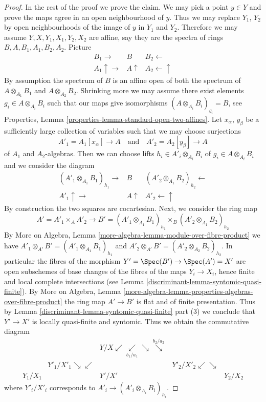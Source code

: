 \begin{proof}
\medskip\noindent
In the rest of the proof we prove the claim. We may pick a point
$y \in Y$ and prove the maps agree in an open neighbourhood of $y$.
Thus we may replace $Y_1$, $Y_2$ by open neighbourhoods of the
image of $y$ in $Y_1$ and $Y_2$. Therefore we may assume
$Y, X, Y_1, X_1, Y_2, X_2$ are affine, say they are the spectra
of rings $B, A, B_1, A_1, B_2, A_2$. Picture
$$
\begin{array}{ccc}B_1 \longrightarrow & B & B_2 \longleftarrow \\ A_1 \uparrow\longrightarrow & A \uparrow & A_2 \longleftarrow\uparrow\end{array}
$$
By assumption the spectrum of $B$ is an affine open of
both the spectrum of $A \otimes_{A_1} B_1$ and $A \otimes_{A_2} B_2$.
Shrinking more we may assume there exist elements
$g_i \in A \otimes_{A_i} B_i$ such that our maps give isomorphisms
$(A \otimes_{A_i} B_i)_{g_i} = B$, see
Properties, Lemma \ref{properties-lemma-standard-open-two-affines}.
Let $x_\alpha$, $y_\beta$ be a sufficiently large collection of
variables such that we may choose surjections
$$
A'_1 = A_1[x_\alpha] \to A
\quad\text{and}\quad
A'_2 = A_2[y_\beta] \to A
$$
of $A_1$ and $A_2$-algebras. Then we can choose lifts
$h_i \in A'_i \otimes_{A_i} B_i$ of $g_i \in A \otimes_{A_i} B_i$
and we consider the diagram
$$
\begin{array}{ccc}(A'_1 \otimes_{A_1} B_1)_{h_1} \longrightarrow & B & (A'_2 \otimes_{A_1} B_2)_{h_2} \longleftarrow \\ A'_1 \uparrow\longrightarrow & A \uparrow & A'_2 \longleftarrow\uparrow\end{array}
$$
By construction the two squares are cocartesian. Next, we consider the
ring map
$$
A' = A'_1 \times_A A'_2 \longrightarrow
B' =
(A'_1 \otimes_{A_1} B_1)_{h_1} \times_B
(A'_2 \otimes_{A_1} B_2)_{h_2}
$$
By
More on Algebra, Lemma \ref{more-algebra-lemma-module-over-fibre-product}
we have $A'_1 \otimes_{A'} B' = (A'_1 \otimes_{A_1} B_1)_{h_1}$
and $A'_2 \otimes_{A'} B' = (A'_2 \otimes_{A_2} B_2)_{h_2}$. In particular
the fibres of the morphism $Y' = \Spec(B') \to \Spec(A') = X'$ are
open subschemes of base changes of the fibres of the maps $Y_i \to X_i$,
hence finite and local complete intersections
(see Lemma \ref{discriminant-lemma-syntomic-quasi-finite}).
By More on Algebra, Lemma
\ref{more-algebra-lemma-properties-algebras-over-fibre-product}
the ring map $A' \to B'$ is flat and of finite presentation.
Thus by Lemma \ref{discriminant-lemma-syntomic-quasi-finite} part (3)
we conclude that $Y' \to X'$ is locally quasi-finite and syntomic.
Thus we obtain the commutative diagram
$$
\begin{array}{ccccc} &  & Y/X \swarrow\underset{b_1/a_1}{\swarrow}\searrow\overset{b_2/a_2}{\searrow} &  &  \\  & Y'_1/X'_1 \searrow\swarrow &  & Y'_2/X'_2 \swarrow\searrow &  \\ Y_1/X_1 &  & Y'/X' &  & Y_2/X_2\end{array}
$$
where $Y'_i/X'_i$ corresponds to $A'_i \to (A'_i \otimes_{A_i} B_i)_{h_i}$.


\end{proof}
